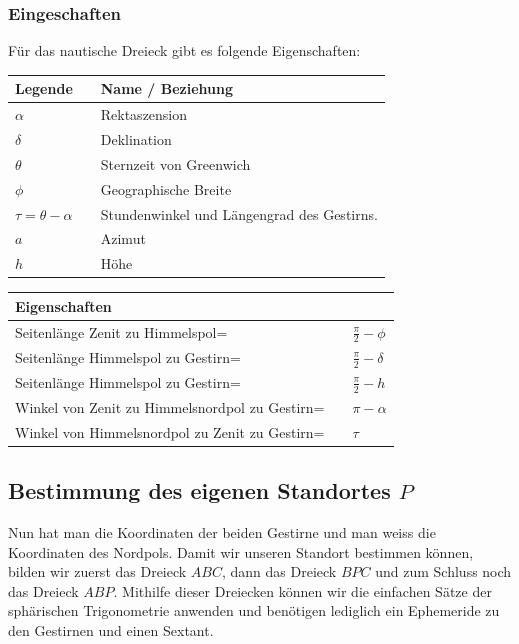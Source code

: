 \subsubsection{Eingeschaften}
Für das nautische Dreieck gibt es folgende Eigenschaften:
\begin{center}
	\begin{tabular}{ l c l }
		Legende && Name / Beziehung \\ 
		\hline
		$\alpha$ && Rektaszension \\  
		$\delta$ && Deklination \\
		$\theta$ && Sternzeit von Greenwich\\
		$\phi$  &&  Geographische Breite\\
		$\tau=\theta-\alpha$ && Stundenwinkel und Längengrad des Gestirns. \\
		$a$ &&      Azimut\\
		$h$ &&      Höhe
	\end{tabular}
\end{center}
\begin{center}
	\begin{tabular}{ l c l }
		Eigenschaften \\
		\hline
		Seitenlänge Zenit zu Himmelspol= && $\frac{\pi}{2} - \phi$  \\  
		Seitenlänge Himmelspol zu Gestirn= && $\frac{\pi}{2} - \delta$  \\
		Seitenlänge Himmelspol zu Gestirn= && $\frac{\pi}{2} - h$ \\
		Winkel von Zenit zu Himmelsnordpol zu Gestirn=  &&  $\pi-\alpha$\\
		Winkel von Himmelsnordpol zu Zenit zu Gestirn= && $\tau$\\
	\end{tabular}
\end{center}
\subsection{Bestimmung des eigenen Standortes $P$}
Nun hat man die Koordinaten der beiden Gestirne und man weiss die Koordinaten des Nordpols.
Damit wir unseren Standort bestimmen können, bilden wir zuerst das Dreieck $ABC$, dann das Dreieck $BPC$ und zum Schluss noch das Dreieck $ABP$.
Mithilfe dieser Dreiecken können wir die einfachen Sätze der sphärischen Trigonometrie anwenden und benötigen lediglich ein Ephemeride zu den Gestirnen und einen Sextant.

